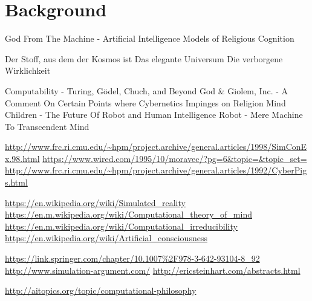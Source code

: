\section{Background}

God From The Machine - Artificial Intelligence Models of Religious Cognition

Der Stoff, aus dem der Kosmos ist
Das elegante Universum
Die verborgene Wirklichkeit

Computability - Turing, Gödel, Chuch, and Beyond
God \& Giolem, Inc. - A Comment On Certain Points where Cybernetics Impinges on Religion
Mind Children - The Future Of Robot and Human Intelligence
Robot - Mere Machine To Transcendent Mind

\url{http://www.frc.ri.cmu.edu/~hpm/project.archive/general.articles/1998/SimConEx.98.html}
\url{https://www.wired.com/1995/10/moravec/?pg=6&topic=&topic_set=}
\url{http://www.frc.ri.cmu.edu/~hpm/project.archive/general.articles/1992/CyberPigs.html}

\url{https://en.wikipedia.org/wiki/Simulated_reality}
\url{https://en.m.wikipedia.org/wiki/Computational_theory_of_mind}
\url{https://en.m.wikipedia.org/wiki/Computational_irreducibility}
\url{https://en.wikipedia.org/wiki/Artificial_consciousness}

\url{https://link.springer.com/chapter/10.1007%2F978-3-642-93104-8_92}
\url{http://www.simulation-argument.com/}
\url{http://ericsteinhart.com/abstracts.html}

\url{http://aitopics.org/topic/computational-philosophy}